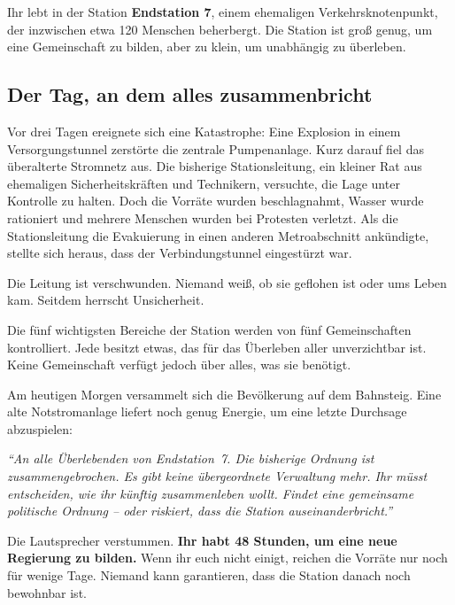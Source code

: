 Ihr lebt in der Station \textbf{Endstation 7}, einem ehemaligen Verkehrsknotenpunkt, der inzwischen etwa 120 Menschen beherbergt. Die Station ist groß genug, um eine Gemeinschaft zu bilden, aber zu klein, um unabhängig zu überleben.

\subsection*{Der Tag, an dem alles zusammenbricht}
Vor drei Tagen ereignete sich eine Katastrophe: Eine Explosion in einem Versorgungstunnel zerstörte die zentrale Pumpenanlage. Kurz darauf fiel das überalterte Stromnetz aus. Die bisherige Stationsleitung, ein kleiner Rat aus ehemaligen Sicherheitskräften und Technikern, versuchte, die Lage unter Kontrolle zu halten. Doch die Vorräte wurden beschlagnahmt, Wasser wurde rationiert und mehrere Menschen wurden bei Protesten verletzt. Als die Stationsleitung die Evakuierung in einen anderen Metroabschnitt ankündigte, stellte sich heraus, dass der Verbindungstunnel eingestürzt war.

Die Leitung ist verschwunden. Niemand weiß, ob sie geflohen ist oder ums Leben kam. Seitdem herrscht Unsicherheit.

Die fünf wichtigsten Bereiche der Station werden von fünf Gemeinschaften kontrolliert. Jede besitzt etwas, das für das Überleben aller unverzichtbar ist. Keine Gemeinschaft verfügt jedoch über alles, was sie benötigt.

Am heutigen Morgen versammelt sich die Bevölkerung auf dem Bahnsteig. Eine alte Notstromanlage liefert noch genug Energie, um eine letzte Durchsage abzuspielen:
\fi

\begin{tcolorbox}[enhanced,colback=black!85,colframe=black,coltext=white,arc=1.5mm,left=5mm,right=5mm,top=3mm,bottom=3mm]
\itshape \enquote{An alle Überlebenden von Endstation~7. Die bisherige Ordnung ist zusammengebrochen. Es gibt keine übergeordnete Verwaltung mehr. Ihr müsst entscheiden, wie ihr künftig zusammenleben wollt. Findet eine gemeinsame politische Ordnung -- oder riskiert, dass die Station auseinanderbricht.}
\end{tcolorbox}

Die Lautsprecher verstummen. \textbf{Ihr habt 48 Stunden, um eine neue Regierung zu bilden.} Wenn ihr euch nicht einigt, reichen die Vorräte nur noch für wenige Tage. Niemand kann garantieren, dass die Station danach noch bewohnbar ist.

\clearpage
{}
\small{}

